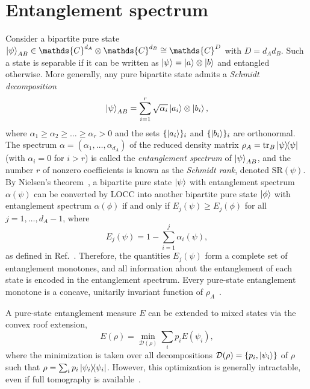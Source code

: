 \documentclass[aps,pra,twocolumn,showpacs,superscriptaddress,groupedaddress]{revtex4-2}
\renewcommand{\a}{\alpha}
\newcommand{\C}{\mathds{C}}
\begin{document}
\section{Entanglement spectrum}

Consider a bipartite pure state $\ket{\psi}_{AB} \in \C^{d_A} \otimes \C^{d_B} \cong \C^D$ with $D = d_Ad_B$. Such a state is separable if it can be written as $\ket{\psi}=\ket{a}\otimes\ket{b}$ and entangled otherwise. More generally, any pure bipartite state admits a \emph{Schmidt decomposition}
\begin{equation}\label{eq:SchmidtDec}
    \ket{\psi}_{AB} = \sum_{i=1}^r \sqrt{\a_i}\ket{a_i}\otimes\ket{b_i},
\end{equation}
where $\a_1\geq\a_2\geq\dots\geq\a_r>0$ and the sets $\{\ket{a_i}\}_i$ and $\{\ket{b_i}\}_i$ are orthonormal. The spectrum $\a=(\a_1,\dots,\a_{d_A})$ of the reduced density matrix $\rho_A=\tr_B\dyad{\psi}$ (with $\a_i=0$ for $i>r$) is called the {\em entanglement spectrum} of $\ket{\psi}_{AB}$, and the number $r$ of nonzero coefficients is known as the {\em Schmidt rank}, denoted $\mathrm{SR}(\psi)$.
By Nielsen's theorem~\cite{Nielsen1999MajLOCC}, a bipartite pure state $\ket{\psi}$ with entanglement spectrum $\a(\psi)$ can be converted by LOCC into another bipartite pure state $\ket{\phi}$ with entanglement spectrum $\a(\phi)$ if and only if $E_j(\psi)\geq E_j(\phi)$ for all $j=1,\dots,d_A-1$, where
\begin{equation}\label{eq:Vidal}
    E_j(\psi)=1-\sum_{i=1}^{j} \a_i(\psi),
\end{equation}
as defined in Ref.~\cite{Vidal_1999}. Therefore, the quantities $E_j(\psi)$ form a complete set of entanglement monotones, and all information about the entanglement of each state is encoded in the entanglement spectrum. Every pure-state entanglement monotone is a concave, unitarily invariant function of $\rho_A$~\cite{Vidal_2000}.

A pure-state entanglement measure $E$ can be extended to mixed states via the convex roof extension,
\begin{equation}\label{eq:CRoof}
    E(\rho) = \min_{\mathcal{D}(\rho)} \sum_i p_i E(\psi_i),
\end{equation}
where the minimization is taken over all decompositions
$\mathcal{D}(\rho)=\{p_i,\ket{\psi_i}\}$ of $\rho$ such that $\rho = \sum_i p_i \dyad{\psi_i}$. However, this optimization is generally intractable, even if full tomography is available~\cite{gurvits2003classicaldeterministiccomplexityedmonds}.
\end{document}
